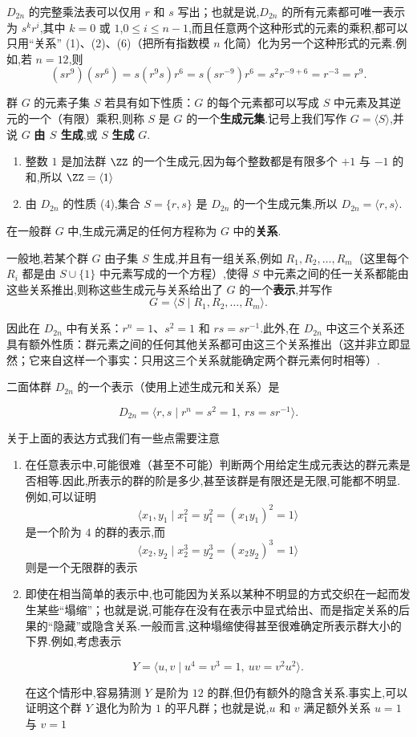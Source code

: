 $D_{2n}$ 的完整乘法表可以仅用 $r$ 和 $s$ 写出；也就是说,$D_{2n}$ 的所有元素都可唯一表示为 $s^kr^i$,其中 $k=0$ 或 $1$,$0\leq i\leq n-1$,而且任意两个这种形式的元素的乘积,都可以只用“关系” (1)、(2)、(6)（把所有指数模 $n$ 化简）化为另一个这种形式的元素.例如,若 $n=12$,则
\[
(sr^9)(sr^6)=s(r^9s)r^6=s(sr^{-9})r^6=s^2r^{-9+6}=r^{-3}=r^9.
\]

\begin{definition}
	群 $G$ 的元素子集 $S$ 若具有如下性质：$G$ 的每个元素都可以写成 $S$ 中元素及其逆元的一个（有限）乘积,则称 $S$ 是 $G$ 的一个\textbf{生成元集}.记号上我们写作 $G=\langle S\rangle$,并说 $G$ \textbf{由 $S$ 生成},或 $S$ \textbf{生成} $G$.
\end{definition}
\begin{example}
	\begin{enumerate}
		\item 整数 $1$ 是加法群 $\ZZ$ 的一个生成元,因为每个整数都是有限多个 $+1$ 与 $-1$ 的和,所以 $\ZZ=\langle 1\rangle$
		\item 由 $D_{2n}$ 的性质 (4),集合 $S=\{r,s\}$ 是 $D_{2n}$ 的一个生成元集,所以 $D_{2n}=\langle r,s\rangle$.
	\end{enumerate}
\end{example}
\begin{definition}
	在一般群 $G$ 中,生成元满足的任何方程称为 $G$ 中的\textbf{关系}.
	
	一般地,若某个群 $G$ 由子集 $S$ 生成,并且有一组关系,例如 $R_1,R_2,\ldots,R_m$（这里每个 $R_i$ 都是由 $S\cup\{1\}$ 中元素写成的一个方程）,使得 $S$ 中元素之间的任一关系都能由这些关系推出,则称这些生成元与关系给出了 $G$ 的一个\textbf{表示},并写作
	\[
	G=\langle S\mid R_1,R_2,\ldots,R_m\rangle.
	\]
\end{definition}
因此在 $D_{2n}$ 中有关系：$r^n=1$、$s^2=1$ 和 $rs=sr^{-1}$.此外,在 $D_{2n}$ 中这三个关系还具有额外性质：群元素之间的任何其他关系都可由这三个关系推出（这并非立即显然；它来自这样一个事实：只用这三个关系就能确定两个群元素何时相等）.

二面体群 $D_{2n}$ 的一个表示（使用上述生成元和关系）是

\[ 	D_{2n}=\langle r,s\mid r^n=s^2=1,\ rs=sr^{-1}\rangle.  \]


关于上面的表达方式我们有一些点需要注意
\begin{enumerate}
	\item 在任意表示中,可能很难（甚至不可能）判断两个用给定生成元表达的群元素是否相等.因此,所表示的群的阶是多少,甚至该群是有限还是无限,可能都不明显.例如,可以证明
	\[
	\langle x_1,y_1\mid x_1^2=y_1^2=(x_1y_1)^2=1\rangle
	\]
	是一个阶为 $4$ 的群的表示,而
	\[
	\langle x_2,y_2\mid x_2^3=y_2^3=(x_2y_2)^3=1\rangle
	\]
	则是一个无限群的表示
	\item 即使在相当简单的表示中,也可能因为关系以某种不明显的方式交织在一起而发生某些“塌缩”；也就是说,可能存在没有在表示中显式给出、而是指定关系的后果的“隐藏”或隐含关系.一般而言,这种塌缩使得甚至很难确定所表示群大小的下界.例如,考虑表示
	
		\[ Y=\langle u,v\mid u^4=v^3=1,\ uv=v^2u^2\rangle.  \]
	
	在这个情形中,容易猜测 $Y$ 是阶为 $12$ 的群,但仍有额外的隐含关系.事实上,可以证明这个群 $Y$ 退化为阶为 $1$ 的平凡群；也就是说,$u$ 和 $v$ 满足额外关系 $u=1$ 与 $v=1$
\end{enumerate}
